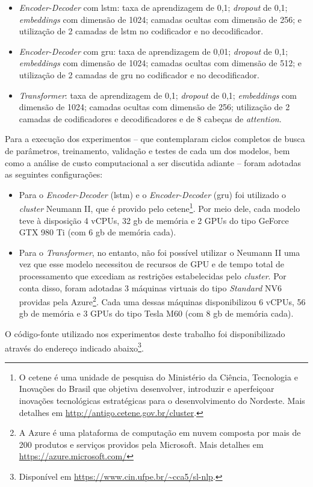 

\begin{itemize}
    \item \textit{Encoder-Decoder} com \acrshort{lstm}: taxa de aprendizagem de 0,1; \textit{dropout} de 0,1; \textit{embeddings} com dimensão de 1024; camadas ocultas com dimensão de 256; e utilização de 2 camadas de \acrshort{lstm} no codificador e no decodificador.

    \item \textit{Encoder-Decoder} com \acrshort{gru}: taxa de aprendizagem de 0,01; \textit{dropout} de 0,1; \textit{embeddings} com dimensão de 1024; camadas ocultas com dimensão de 512; e utilização de 2 camadas de \acrshort{gru} no codificador e no decodificador.

    \item \textit{Transformer}: taxa de aprendizagem de 0,1; \textit{dropout} de 0,1; \textit{embeddings} com dimensão de 1024; camadas ocultas com dimensão de 256; utilização de 2 camadas de codificadores e decodificadores e de 8 cabeças de \textit{attention}.
\end{itemize}


Para a execução dos experimentos -- que contemplaram ciclos completos de busca de parâmetros, treinamento, validação e testes de cada um dos modelos, bem como a análise de custo computacional a ser discutida adiante -- foram adotadas as seguintes configurações:

\begin{itemize}
    \item Para o \textit{Encoder-Decoder} (\acrshort{lstm}) e o \textit{Encoder-Decoder} (\acrshort{gru}) foi utilizado o \textit{cluster} Neumann II, que é provido pelo \acrfull{cetene}\footnote{
              O \acrshort{cetene} é uma unidade de pesquisa do Ministério da Ciência, Tecnologia e Inovações do Brasil que objetiva desenvolver, introduzir e aperfeiçoar inovações tecnológicas estratégicas para o desenvolvimento do Nordeste. Mais detalhes em \url{http://antigo.cetene.gov.br/cluster}.
          }.
          Por meio dele, cada modelo teve à disposição 4 vCPUs, 32 \acrshort{gb} de memória e 2 GPUs do tipo GeForce GTX 980 Ti (com 6 \acrshort{gb} de memória cada).

    \item Para o \textit{Transformer}, no entanto, não foi possível utilizar o Neumann II uma vez que esse modelo necessitou de recursos de GPU e de tempo total de processamento que excediam as restrições estabelecidas pelo \textit{cluster}.
          Por conta disso, foram adotadas 3 máquinas virtuais do tipo \textit{Standard} NV6 providas pela Azure\footnote{
              A Azure é uma plataforma de computação em nuvem composta por mais de 200 produtos e serviços providos pela Microsoft. Mais detalhes em \url{https://azure.microsoft.com/}
          }. Cada uma dessas máquinas disponibilizou 6 vCPUs, 56 \acrshort{gb} de memória e 3 GPUs do tipo Tesla M60 (com 8 \acrshort{gb} de memória cada).

\end{itemize}


O código-fonte utilizado nos experimentos deste trabalho foi disponibilizado através do endereço indicado abaixo\footnote{
    Disponível em \url{https://www.cin.ufpe.br/~cca5/sl-nlp}.
}.
